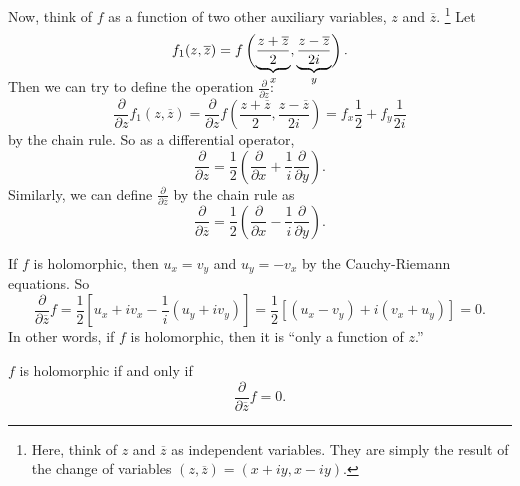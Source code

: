 Now, think of $f$ as a function of two other auxiliary
variables, $z$ and $\overline{z}$.
\footnote{Here, think of $z$ and $\overline{z}$ as
  independent variables. They are simply the result of
  the change of variables
  $(z, \overline{z}) = (x + iy, x - iy)$.}
Let
\[
  f_1(z, \overline{z}) = f\left(\smash[b]{\underbrace{\frac{z + \overline{z}}{2}}_{x}}, \smash[b]{\underbrace{\frac{z - \overline{z}}{2i}}_{y}}\right)
.\]
Then we can try to define the operation
$\frac{\partial}{\partial z}$:
\[
\frac{\partial}{\partial z} f_1(z, \overline{z}) =
\frac{\partial}{\partial z} f\left(\frac{z + \overline{z}}{2}, \frac{z - \overline{z}}{2i}\right) =
f_x \frac{1}{2} + f_y \frac{1}{2i}
\]
by the chain rule. So as a differential operator,
\[
\frac{\partial}{\partial z} = \frac{1}{2} \left(\frac{\partial}{\partial x} + \frac{1}{i} \frac{\partial}{\partial y}\right)
.\]
Similarly, we can define
$\frac{\partial}{\partial \overline{z}}$ by the chain rule
as
\[
\frac{\partial}{\partial \overline{z}} = \frac{1}{2} \left(\frac{\partial}{\partial x} - \frac{1}{i}\frac{\partial}{\partial y}\right)
.\]

If $f$ is holomorphic, then $u_x = v_y$ and $u_y = -v_x$
by the Cauchy-Riemann equations. So
\[
\frac{\partial}{\partial \overline{z}} f = \frac{1}{2}\left[u_x + iv_x - \frac{1}{i}(u_y + iv_y)\right]
= \frac{1}{2}\left[(u_x - v_y) + i(v_x + u_y)\right] = 0
.\]
In other words, if $f$ is holomorphic, then it is
``only a function of $z$.''

\begin{tcolorbox}[title=Theorem]
  $f$ is holomorphic if and only if
  \[
  \frac{\partial}{\partial \overline{z}} f = 0
  .\]
\end{tcolorbox}
